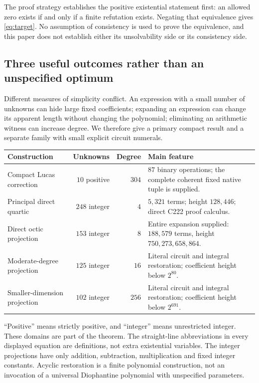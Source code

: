 \documentclass[11pt,letterpaper]{article}
\theoremstyle{definition}
\theoremstyle{remark}
\begin{document}
The proof strategy establishes the positive existential statement first:
an allowed zero exists if and only if a finite refutation exists.  Negating
that equivalence gives \eqref{eq:target}.  No assumption of consistency is
used to prove the equivalence, and this paper does not establish either its
unsolvability side or its consistency side.

\subsection{Three useful outcomes rather than an unspecified optimum}

Different measures of simplicity conflict.  An expression with a small
number of unknowns can hide large fixed coefficients; expanding an expression
can change its apparent length without changing the polynomial; eliminating
an arithmetic witness can increase degree.  We therefore give a primary
compact result and a separate family with small explicit circuit numerals.

\begin{center}
\begin{tabular}{@{}lrrp{6.0cm}@{}}
\toprule
Construction & Unknowns & Degree & Main feature\\
\midrule
Compact Lucas correction & $10$ positive & $304$ & $87$ binary operations;
the complete coherent fixed native tuple is supplied.\\[3pt]
Principal direct quartic & $248$ integer & $4$ & $5{,}321$ terms;
height $128{,}446$; direct C222 proof calculus.\\[3pt]
Direct octic projection & $153$ integer & $8$ & Entire expansion supplied:
$188{,}579$ terms, height $750{,}273{,}658{,}864$.\\[3pt]
Moderate-degree projection & $125$ integer & $16$ & Literal circuit and
integral restoration; coefficient height below $2^{80}$.\\[3pt]
Smaller-dimension projection & $102$ integer & $256$ & Literal circuit and
integral restoration; coefficient height below $2^{691}$.\\
\bottomrule
\end{tabular}
\end{center}

``Positive'' means strictly positive, and ``integer'' means unrestricted
integer.  These domains are part of the theorem.  The straight-line
abbreviations in every displayed equation are definitions, not extra
existential variables.  The integer projections have only addition,
subtraction, multiplication and fixed integer constants.  Acyclic
restoration is a finite polynomial construction, not an invocation of a
universal Diophantine polynomial with unspecified parameters.
\end{document}
